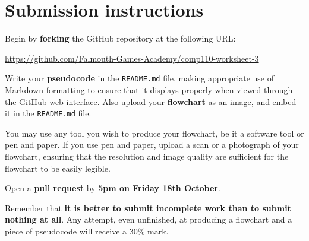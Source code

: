 \documentclass{../../../fal_assignment}
\begin{document}
\section*{Submission instructions}

Begin by \textbf{forking} the GitHub repository at the following URL:

\url{https://github.com/Falmouth-Games-Academy/comp110-worksheet-3}

Write your \textbf{pseudocode} in the \texttt{README.md} file,
making appropriate use of Markdown formatting to ensure that it displays properly when viewed through the GitHub web interface.
Also upload your \textbf{flowchart} as an image, and embed it in the \texttt{README.md} file.

You may use any tool you wish to produce your flowchart,
be it a software tool or pen and paper.
If you use pen and paper, upload a scan or a photograph of your flowchart,
ensuring that the resolution and image quality are sufficient for the flowchart to be easily legible.

Open a \textbf{pull request} by \textbf{5pm on Friday 18th October}.

Remember that \textbf{it is better to submit incomplete work than to submit nothing at all}.
Any attempt, even unfinished, at producing a flowchart and a piece of pseudocode will receive a 30\% mark.
\end{document}
